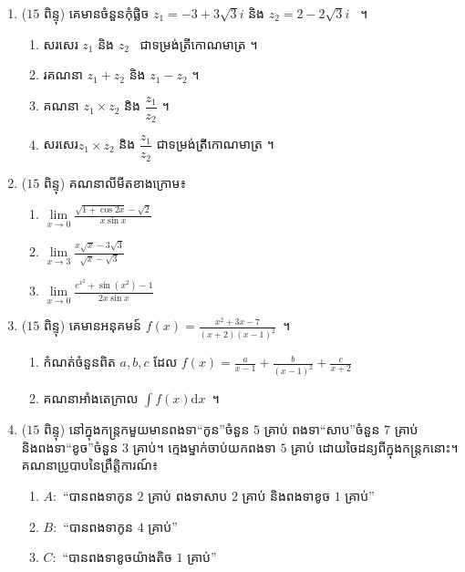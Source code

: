 \documentclass[12pt, legalpaper]{exam}
\begin{document}
	\begin{enumerate}[I]
		\item ($ 15 $ ពិន្ទុ) គេមានចំនួនកុំផ្លិច $ z_{1}=-3+3\sqrt{3}i $ និង $ z_{2}=2-2\sqrt{3}i $~ ។​
		\begin{enumerate}[1]
			\item សរសេរ $ z_{1} $ និង $ z_{2} $​~ ជាទម្រង់ត្រីកោណមាត្រ ។
			\item រគណនា $ z_{1} +z_{2} $ និង $ z_{1}-z_{2} $ ។
			\item គណនា $ z_{1}\times z_{2} $ និង $ \dfrac{z_{1}}{z_{2}} $ ។
			\item សរសេរ​ $ z_{1}\times z_{2} $ និង $ \dfrac{z_{1}}{z_{2}} $ ជាទម្រង់ត្រីកោណមាត្រ ។
		\end{enumerate}
		\item ($ 15 $ ពិន្ទុ) គណនាលីមីតខាងក្រោម៖
		\begin{multicols}{3}
			\begin{enumerate}[a]
				\item $ \lim\limits_{x\to 0}\frac{\sqrt{1+\cos2x}-\sqrt{2}}{x\sin x} $
				\item $ \lim\limits_{x\to 3}\frac{x\sqrt{x}-3\sqrt{3}}{\sqrt{x}-\sqrt{3}} $
				\item $ \lim\limits_{x\to 0}\frac{e^{x^2}+\sin (x^2)-1}{2x\sin x} $
			\end{enumerate}
		\end{multicols}
		\item ($ 15 $ ពិន្ទុ) គេមានអនុគមន៍ $ f(x)=\frac{x^2+3x-7}{(x+2)(x-1)^2} $~។
		\begin{enumerate}[1]
			\item កំណត់ចំនួនពិត $ a,b,c $ ដែល $ f(x)=\frac{a}{x-1}+\frac{b}{(x-1)^2}+\frac{c}{x+2} $
			\item គណនាអាំងតេក្រាល $ \int f(x)\mathrm{d}x $~។
		\end{enumerate}
		\item ($ 15 $ ពិន្ទុ) នៅក្នុងកន្ត្រកមួយមានពងទា``កូន''ចំនួន $ 5 $ គ្រាប់ ពងទា``សាប''ចំនួន $ 7 $ គ្រាប់ និងពងទា``ខូច''ចំនួន $ 3 $ គ្រាប់។ ក្មេងម្នាក់ចាប់យកពងទា $ 5 $ គ្រាប់ ដោយចៃដន្យពីក្នុងកន្ត្រកនោះ។\\
		គណនាប្រូបាបនៃព្រឹត្តិការណ៍៖
		\begin{enumerate}[a]
			\item $ A: $ ``បានពងទាកូន $ 2 $ គ្រាប់ ពងទាសាប $ 2 $ គ្រាប់ និងពងទាខូច $ 1 $ គ្រាប់''
			\item $ B: $ ``បានពងទាកូន $ 4 $ គ្រាប់''
			\item $ C: $ ``បានពងទាខូចយ៉ាងតិច $ 1 $ គ្រាប់''
		\end{enumerate}

\end{enumerate}
\end{document}
